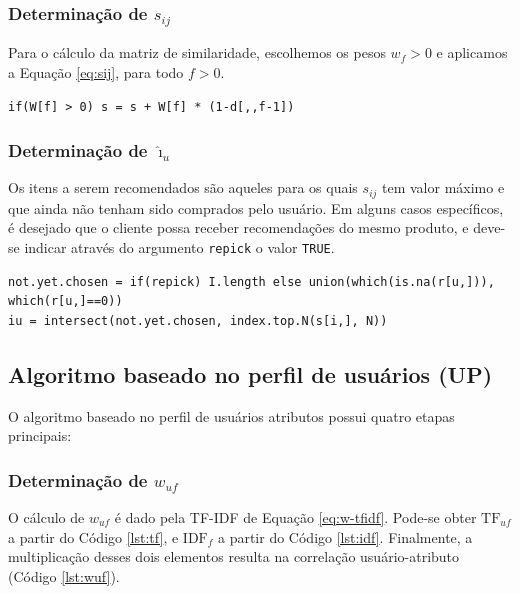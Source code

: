 \subsubsection{Determinação de  $s_{ij}$} %
\label{ssub:determina_o_de_s__ij_}

Para o cálculo da matriz de similaridade, escolhemos os pesos $w_f>0$ e aplicamos a Equação \ref{eq:sij}, para todo $f>0$.

\begin{lstlisting}[caption=Determinação de $s_{ij}$]
if(W[f] > 0) s = s + W[f] * (1-d[,,f-1])
\end{lstlisting}

\subsubsection{Determinação de $\hat{\imath}_u$} %
\label{ssub:determina_o_de_i_u_}

Os itens a serem recomendados são aqueles para os quais $s_{ij}$ tem valor máximo e que ainda não tenham sido comprados pelo usuário. Em alguns casos específicos, é desejado que o cliente possa receber recomendações do mesmo produto, e deve-se indicar através do argumento \texttt{repick} o valor \texttt{TRUE}.

\begin{lstlisting}[caption=Determinação de $\hat{\imath}_{u}$]
not.yet.chosen = if(repick) I.length else union(which(is.na(r[u,])), which(r[u,]==0))
iu = intersect(not.yet.chosen, index.top.N(s[i,], N))
\end{lstlisting}

\subsection{Algoritmo baseado no perfil de usuários (UP)} %
\label{sub:algoritmo_baseado_no_perfil_de_usu_rios_up_}

O algoritmo baseado no perfil de usuários atributos possui quatro etapas principais: 


\subsubsection{Determinação de $w_{uf}$} %
\label{ssub:determina_o_de_wuf}

O cálculo de $w_{uf}$ é dado pela TF-IDF de Equação \ref{eq:w-tfidf}. Pode-se obter $\mathrm{TF}_{uf}$ a partir do Código \ref{lst:tf}, e $\mathrm{IDF}_{f}$ a partir do Código \ref{lst:idf}. Finalmente, a multiplicação desses dois elementos resulta na correlação usuário-atributo (Código \ref{lst:wuf}).


